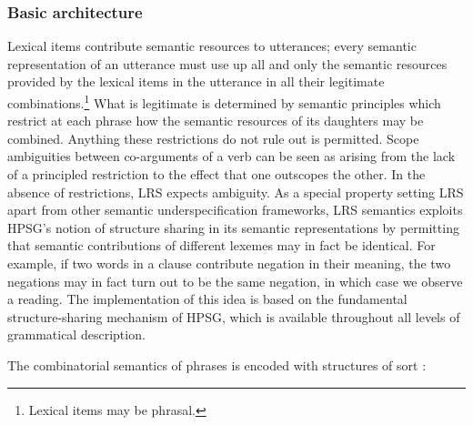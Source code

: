 \documentclass[output=paper
	        ,collection
	        ,collectionchapter
 	        ,biblatex
                ,babelshorthands
                ,newtxmath
                ,draftmode
                ,colorlinks, citecolor=brown
]{langscibook}
\begin{document}
\subsubsection{Basic architecture}

Lexical items contribute semantic resources to utterances; every semantic representation of an utterance must use up all and only the semantic resources provided by the lexical items in the utterance in all their legitimate combinations.\footnote{Lexical items may be phrasal.} What is legitimate is determined by semantic principles which restrict at each phrase how the semantic resources of its daughters may be combined. Anything these restrictions do not rule out is permitted. Scope ambiguities between co-arguments of a verb can be seen as arising from the lack of a principled restriction to the effect that one outscopes the other. In the absence of restrictions, LRS expects ambiguity. As a special property setting LRS apart from other semantic underspecification frameworks, LRS semantics exploits HPSG's notion of structure sharing in its semantic representations by permitting that semantic contributions of different lexemes may in fact be identical. For example, if two words in a clause contribute negation in their meaning, the two negations may in fact turn out to be the same negation, in which case we observe a  reading. The implementation of this idea is based on the fundamental structure-sharing mechanism of HPSG, which is available throughout all levels of grammatical description.

The combinatorial semantics of phrases is encoded with structures of sort :


\begin{exe}
  \ex\label{lrs-str}
\end{exe}
\end{document}
